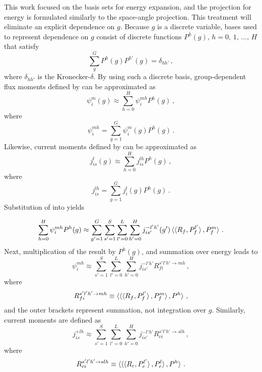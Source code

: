 This work focused on the basis sets for energy expansion, and the 
projection for energy is formulated similarly to the space-angle 
projection.  This treatment will eliminate an explicit dependence on $g$. 
Because $g$ is a discrete variable, bases used to represent 
dependence on $g$ consist of discrete functions $P^h(g), \, h = 0,\, 1,\, 
\ldots, \, H$ that satisfy 
\begin{equation}
    \sum^G_{g} P^h(g) P^{h'}(g) = \delta_{hh'} \, ,
\end{equation}
where $\delta_{hh'}$ is the Kronecker-$\delta$.  By using such a discrete 
basis, group-dependent flux moments defined by  can be 
approximated as
\begin{equation}
    \psi^{m}_{i}(g) \approx \sum_{h=0}^H  \psi^{mh}_{i} P^h(g) \, ,
    \label{eq:groupfluxmoments}
\end{equation}
where 
\begin{equation}
    \psi^{mh}_{i} = \sum^G_{g=1}   \psi^{m}_{i}(g) P^h(g) \, .
    \label{eq:groupcoefficients}
\end{equation}
Likewise, current moments defined by  can be approximated as
\begin{equation}
    j^{l}_{is}(g) \approx \sum_{h=0}^H  j^{lh}_{is} P^h(g) \, ,
    \label{eq:groupcurrentmoments}
\end{equation}
where 
\begin{equation}
    j^{lh}_{is} = \sum^G_{g=1}   j^{l}_{i}(g) P^h(g) \, .
    \label{eq:groupcurrentcoefficients}
\end{equation}
Substitution of  into 
 yields

\begin{equation}
        \sum_{h=0}^H  \psi^{mh}_{i} P^h(g) \approx 
        \sum^{G}_{g'=1} \sum^{S}_{s'=1} \sum_{l'=0}^L \sum^{H}_{h'=0}
        j^{-l'h'}_{is'}(g') 
         \braket{ \braket{ R_{f}, P^{l'}_f}, P^{m}_f} \, .
\end{equation}
Next, multiplication of the result by $P^h(g)$, and summation over energy 
leads to
\begin{equation}
    \psi^{mh}_{i} \approx 
    \sum^{S}_{s'=1} \sum_{l'=0}^L \sum^{H}_{h'=0} 
    j^{-l'h'}_{is'}  R^{s'l'h' \to mh}_{fi} \, ,
    \label{eq:finalfluxmoments}
\end{equation}
where
\begin{equation}
    R^{s'l'h' \to mh}_{fi} \equiv  
    \braket{ \braket{ \braket{ R_{f}, P^{l'}_f}, P^{m}_f}, P^{h}} \, ,
\end{equation}
and the outer brackets represent summation, not integration over $g$. Similarly, 
current moments are defined as
\begin{equation}
    j^{+lh}_{is} \approx 
    \sum^{S}_{s'=1}  \sum_{l'=0}^L \sum^{H}_{h'=0} 
    j^{-l'h'}_{is'}  R^{s'l'h' \to slh}_{ci} \, ,
    \label{eq:finalcurrentmoments}
\end{equation}
where
\begin{equation}
    R^{s'l'h' \to slh}_{ci} \equiv  
    \braket{ \braket{ \braket{ R_{c}, P^{l'}_c}, P^{l}_c}, P^{h}} \, .
\end{equation}

